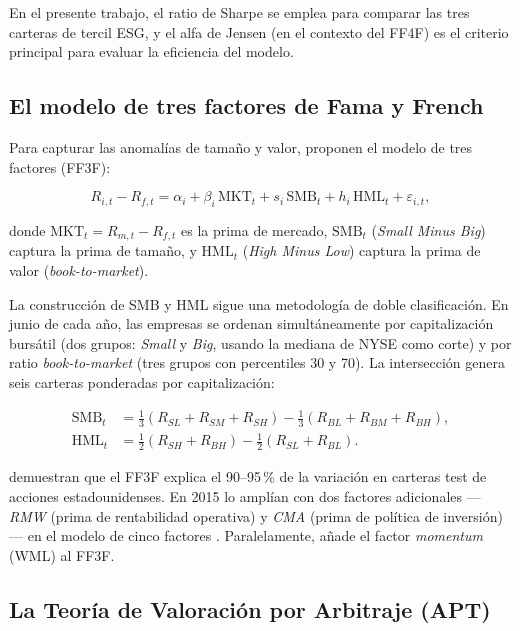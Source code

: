 \documentclass[12pt, a4paper]{article}
\begin{document}
En el presente trabajo, el ratio de Sharpe se emplea para comparar las tres carteras
de tercil ESG, y el alfa de Jensen (en el contexto del FF4F) es el criterio principal
para evaluar la eficiencia del modelo.

\subsection{El modelo de tres factores de Fama y French}
\label{subsec:ff3f}

Para capturar las anomal\'ias de tama\~no y valor, \textcite{famafrench1993} proponen
el modelo de tres factores (FF3F):

\begin{equation}
  \label{eq:ff3f}
  R_{i,t} - R_{f,t} = \alpha_i + \beta_i\,\mathrm{MKT}_t
    + s_i\,\mathrm{SMB}_t + h_i\,\mathrm{HML}_t + \varepsilon_{i,t},
\end{equation}

donde $\mathrm{MKT}_t = R_{m,t}-R_{f,t}$ es la prima de mercado, $\mathrm{SMB}_t$
(\textit{Small Minus Big}) captura la prima de tama\~no, y $\mathrm{HML}_t$
(\textit{High Minus Low}) captura la prima de valor (\textit{book-to-market}).

La construcci\'on de SMB y HML sigue una metodolog\'ia de doble clasificaci\'on.
En junio de cada a\~no, las empresas se ordenan simult\'aneamente por capitalizaci\'on
burs\'atil (dos grupos: \textit{Small} y \textit{Big}, usando la mediana de NYSE
como corte) y por ratio \textit{book-to-market} (tres grupos con percentiles 30 y 70).
La intersecci\'on genera seis carteras ponderadas por capitalizaci\'on:

\begin{align}
  \mathrm{SMB}_t &= \tfrac{1}{3}(R_{SL}+R_{SM}+R_{SH}) - \tfrac{1}{3}(R_{BL}+R_{BM}+R_{BH}), \label{eq:smb} \\
  \mathrm{HML}_t &= \tfrac{1}{2}(R_{SH}+R_{BH}) - \tfrac{1}{2}(R_{SL}+R_{BL}). \label{eq:hml}
\end{align}

\textcite{famafrench1993} demuestran que el FF3F explica el 90--95\,\% de la variaci\'on
en carteras test de acciones estadounidenses. En 2015 lo ampl\'ian con dos factores
adicionales ---\textit{RMW} (prima de rentabilidad operativa) y \textit{CMA} (prima de
pol\'itica de inversi\'on)--- en el modelo de cinco factores \parencite{famafrench2015}.
Paralelamente, \textcite{carhart1997} a\~nade el factor \textit{momentum} (WML) al FF3F.

\subsection{La Teor\'ia de Valoraci\'on por Arbitraje (APT)}
\label{subsec:apt}
\end{document}
